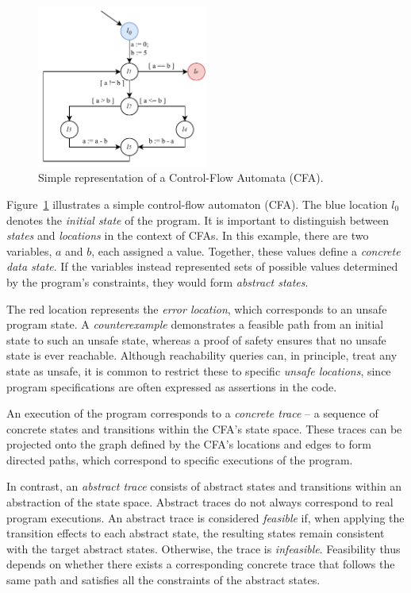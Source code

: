 \begin{figure}
  \centering
  \includegraphics[width=0.5\textwidth]{figures/cfa_simple.drawio.pdf}
  \caption{Simple representation of a Control-Flow Automata (CFA).}
  \label{fig:cfa}
\end{figure}

Figure~\ref{fig:cfa} illustrates a simple control-flow automaton (CFA). The blue location $l_0$ denotes the \textit{initial state} of the program. It is important to distinguish between \textit{states} and \textit{locations} in the context of CFAs. In this example, there are two variables, $a$ and $b$, each assigned a value. Together, these values define a \textit{concrete data state}. If the variables instead represented sets of possible values determined by the program's constraints, they would form \textit{abstract states}.

The red location represents the \textit{error location}, which corresponds to an unsafe program state. A \textit{counterexample} demonstrates a feasible path from an initial state to such an unsafe state, whereas a proof of safety ensures that no unsafe state is ever reachable. Although reachability queries can, in principle, treat any state as unsafe, it is common to restrict these to specific \textit{unsafe locations}, since program specifications are often expressed as assertions in the code.

An execution of the program corresponds to a \textit{concrete trace} -- a sequence of concrete states and transitions within the CFA's state space. These traces can be projected onto the graph defined by the CFA's locations and edges to form directed paths, which correspond to specific executions of the program.

In contrast, an \textit{abstract trace} consists of abstract states and transitions within an abstraction of the state space. Abstract traces do not always correspond to real program executions. An abstract trace is considered \textit{feasible} if, when applying the transition effects to each abstract state, the resulting states remain consistent with the target abstract states. Otherwise, the trace is \textit{infeasible}. Feasibility thus depends on whether there exists a corresponding concrete trace that follows the same path and satisfies all the constraints of the abstract states.


